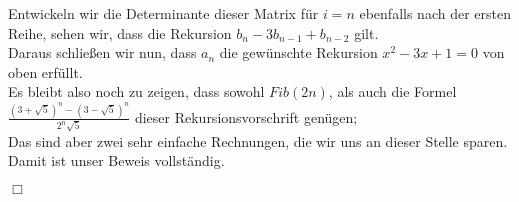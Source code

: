 Entwickeln wir die Determinante dieser Matrix für $i=n$ ebenfalls nach der ersten Reihe, sehen wir, dass die Rekursion $b_n-3b_{n-1} + b_{n-2}$ gilt.\\
Daraus schließen wir nun, dass $a_n$ die gewünschte Rekursion $x^2-3x+1=0$ von oben erfüllt.\\
Es bleibt also noch zu zeigen, dass sowohl $Fib(2n)$, als auch die Formel $\frac{(3+\sqrt{5})^{n}-(3-\sqrt{5})^{n}}{2^{n}\sqrt{5}}$ dieser Rekursionsvorschrift genügen;\\ 
Das sind aber zwei sehr einfache Rechnungen, die wir uns an dieser Stelle sparen.\\
Damit ist unser Beweis vollständig.
\begin{flushright} $\Box$ \end{flushright} 

